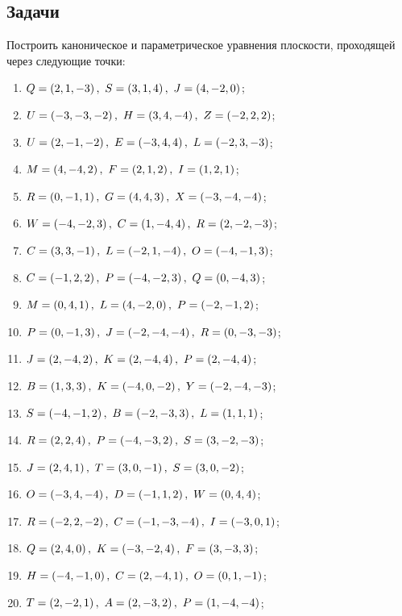 \subsection{Задачи}

	Построить каноническое и параметрическое уравнения плоскости, проходящей через следующие точки:

	\begin{enumerate}
		\setcounter{enumi}{\value{tasks}}

			\item \( Q = \left( 2, 1, -3 \right), ~ S = \left( 3, 1, 4 \right), ~ J = \left( 4, -2, 0 \right) \);
			\item \( U = \left( -3, -3, -2 \right), ~ H = \left( 3, 4, -4 \right), ~ Z = \left( -2, 2, 2 \right) \);
			\item \( U = \left( 2, -1, -2 \right), ~ E = \left( -3, 4, 4 \right), ~ L = \left( -2, 3, -3 \right) \);
			\item \( M = \left( 4, -4, 2 \right), ~ F = \left( 2, 1, 2 \right), ~ I = \left( 1, 2, 1 \right) \);
			\item \( R = \left( 0, -1, 1 \right), ~ G = \left( 4, 4, 3 \right), ~ X = \left( -3, -4, -4 \right) \);
			\item \( W = \left( -4, -2, 3 \right), ~ C = \left( 1, -4, 4 \right), ~ R = \left( 2, -2, -3 \right) \);
			\item \( C = \left( 3, 3, -1 \right), ~ L = \left( -2, 1, -4 \right), ~ O = \left( -4, -1, 3 \right) \);
			\item \( C = \left( -1, 2, 2 \right), ~ P = \left( -4, -2, 3 \right), ~ Q = \left( 0, -4, 3 \right) \);
			\item \( M = \left( 0, 4, 1 \right), ~ L = \left( 4, -2, 0 \right), ~ P = \left( -2, -1, 2 \right) \);
			\item \( P = \left( 0, -1, 3 \right), ~ J = \left( -2, -4, -4 \right), ~ R = \left( 0, -3, -3 \right) \);
			\item \( J = \left( 2, -4, 2 \right), ~ K = \left( 2, -4, 4 \right), ~ P = \left( 2, -4, 4 \right) \);
			\item \( B = \left( 1, 3, 3 \right), ~ K = \left( -4, 0, -2 \right), ~ Y = \left( -2, -4, -3 \right) \);
			\item \( S = \left( -4, -1, 2 \right), ~ B = \left( -2, -3, 3 \right), ~ L = \left( 1, 1, 1 \right) \);
			\item \( R = \left( 2, 2, 4 \right), ~ P = \left( -4, -3, 2 \right), ~ S = \left( 3, -2, -3 \right) \);
			\item \( J = \left( 2, 4, 1 \right), ~ T = \left( 3, 0, -1 \right), ~ S = \left( 3, 0, -2 \right) \);
			\item \( O = \left( -3, 4, -4 \right), ~ D = \left( -1, 1, 2 \right), ~ W = \left( 0, 4, 4 \right) \);
			\item \( R = \left( -2, 2, -2 \right), ~ C = \left( -1, -3, -4 \right), ~ I = \left( -3, 0, 1 \right) \);
			\item \( Q = \left( 2, 4, 0 \right), ~ K = \left( -3, -2, 4 \right), ~ F = \left( 3, -3, 3 \right) \);
			\item \( H = \left( -4, -1, 0 \right), ~ C = \left( 2, -4, 1 \right), ~ O = \left( 0, 1, -1 \right) \);
			\item \( T = \left( 2, -2, 1 \right), ~ A = \left( 2, -3, 2 \right), ~ P = \left( 1, -4, -4 \right) \);

		\setcounter{tasks}{\value{enumi}}
	\end{enumerate}


